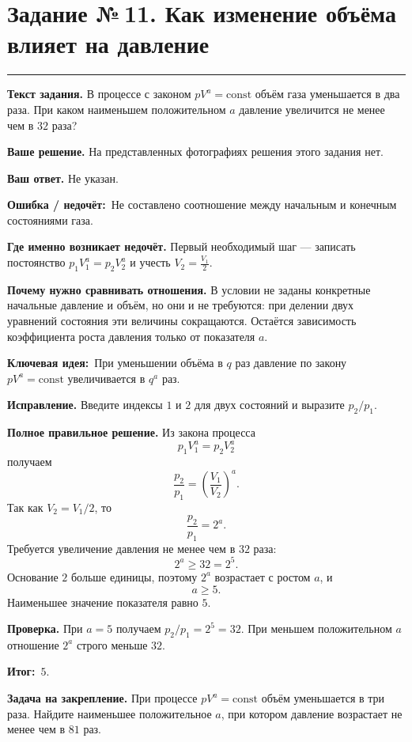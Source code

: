 \documentclass[a4paper,11pt]{article}
\newcommand{\rlabel}[1]{\par\noindent\textbf{\color{darkaccent}#1}\quad}
\newcommand{\errorlabel}{\textcolor{err}{\textbf{Ошибка / недочёт:}}}
\newcommand{\keylabel}{\textcolor{blue!60!black}{\textbf{Ключевая идея:}}}
\newcommand{\finallabel}{\textcolor{teal!60!black}{\textbf{Итог:}}}
\newcommand{\tasktitle}[2]{\clearpage\phantomsection\label{task:#1}\section*{Задание №\,#1. #2}\vspace{-3mm}\textcolor{accent}{\rule{\linewidth}{0.45pt}}}
\begin{document}
\tasktitle{11}{Как изменение объёма влияет на давление}
\rlabel{Текст задания.} В процессе с законом $pV^a=\mathrm{const}$ объём газа уменьшается в два раза. При каком наименьшем положительном $a$ давление увеличится не менее чем в $32$ раза?
\rlabel{Ваше решение.} На представленных фотографиях решения этого задания нет.
\rlabel{Ваш ответ.} Не указан.
\par\noindent\errorlabel\ Не составлено соотношение между начальным и конечным состояниями газа.
\rlabel{Где именно возникает недочёт.} Первый необходимый шаг --- записать постоянство $p_1V_1^a=p_2V_2^a$ и учесть $V_2=\frac{V_1}{2}$.
\rlabel{Почему нужно сравнивать отношения.} В условии не заданы конкретные начальные давление и объём, но они и не требуются: при делении двух уравнений состояния эти величины сокращаются. Остаётся зависимость коэффициента роста давления только от показателя $a$.
\par\noindent\keylabel\ При уменьшении объёма в $q$ раз давление по закону $pV^a=\mathrm{const}$ увеличивается в $q^a$ раз.
\rlabel{Исправление.} Введите индексы $1$ и $2$ для двух состояний и выразите $p_2/p_1$.
\rlabel{Полное правильное решение.} Из закона процесса
\[
p_1V_1^a=p_2V_2^a
\]
получаем
\[
\frac{p_2}{p_1}=\left(\frac{V_1}{V_2}\right)^a.
\]
Так как $V_2=V_1/2$, то
\[
\frac{p_2}{p_1}=2^a.
\]
Требуется увеличение давления не менее чем в $32$ раза:
\[
2^a\ge32=2^5.
\]
Основание $2$ больше единицы, поэтому $2^a$ возрастает с ростом $a$, и
\[
a\ge5.
\]
Наименьшее значение показателя равно $5$.
\rlabel{Проверка.} При $a=5$ получаем $p_2/p_1=2^5=32$. При меньшем положительном $a$ отношение $2^a$ строго меньше $32$.
\par\noindent\finallabel\ $\boxed{5}$.
\rlabel{Задача на закрепление.} При процессе $pV^a=\mathrm{const}$ объём уменьшается в три раза. Найдите наименьшее положительное $a$, при котором давление возрастает не менее чем в $81$ раз.
\end{document}
